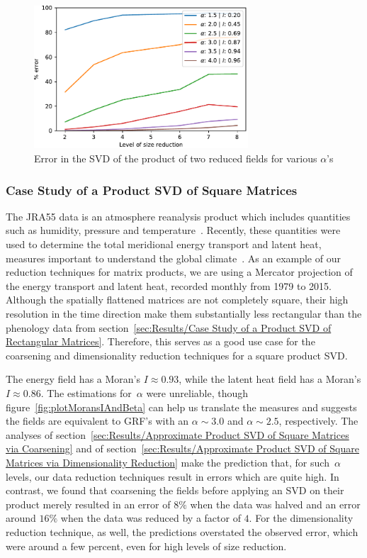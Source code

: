 \documentclass[ijgi,article,submit,moreauthors,pdftex,10pt,a4paper]{Definitions/mdpi}
\begin{document}
\begin{figure}[H]
\centering
\includegraphics[width=80mm]{Results/plotRandomisedSizeReducedMatrixProduct.pdf}
\caption[Error after reduction]{Error in the SVD of the product of two reduced fields for various $\alpha$'s}
\label{fig:plotRandomisedSizeReducedMatrixProduct}
\end{figure}

\subsubsection{Case Study of a Product SVD of Square Matrices}
\label{sec:Results/Case Study of a Product SVD of Square Matrices}

The JRA55 data is an atmosphere reanalysis product which includes quantities such as humidity, pressure and temperature~\cite{Kobayashi2015}. Recently, these quantities were used to determine the total meridional energy transport and latent heat, measures important to understand the global climate~\cite{Liu2018}. As an example of our reduction techniques for matrix products, we are using a Mercator projection of the energy transport and latent heat, recorded monthly from 1979 to 2015. Although the spatially flattened matrices are not completely square, their high resolution in the time direction make them substantially less rectangular than the phenology data from section~\ref{sec:Results/Case Study of a Product SVD of Rectangular Matrices}. Therefore, this serves as a good use case for the coarsening and dimensionality reduction techniques for a square product SVD.

The energy field has a Moran's $I \approx 0.93$, while the latent heat field has a Moran's $I \approx 0.86$. The estimations for~$\alpha$ were unreliable, though figure~\ref{fig:plotMoransIAndBeta} can help us translate the measures and suggests the fields are equivalent to GRF's with an $\alpha \sim 3.0$ and $\alpha \sim 2.5$, respectively. The analyses of section~\ref{sec:Results/Approximate Product SVD of Square Matrices via Coarsening} and of section~\ref{sec:Results/Approximate Product SVD of Square Matrices via Dimensionality Reduction} make the prediction that, for such~$\alpha$ levels, our data reduction techniques result in errors which are quite high. In contrast, we found that coarsening the fields before applying an SVD on their product merely resulted in an error of $8\%$ when the data was halved and an error around $16\%$ when the data was reduced by a factor of $4$. For the dimensionality reduction technique, as well, the predictions overstated the observed error, which were around a few percent, even for high levels of size reduction.
\end{document}
